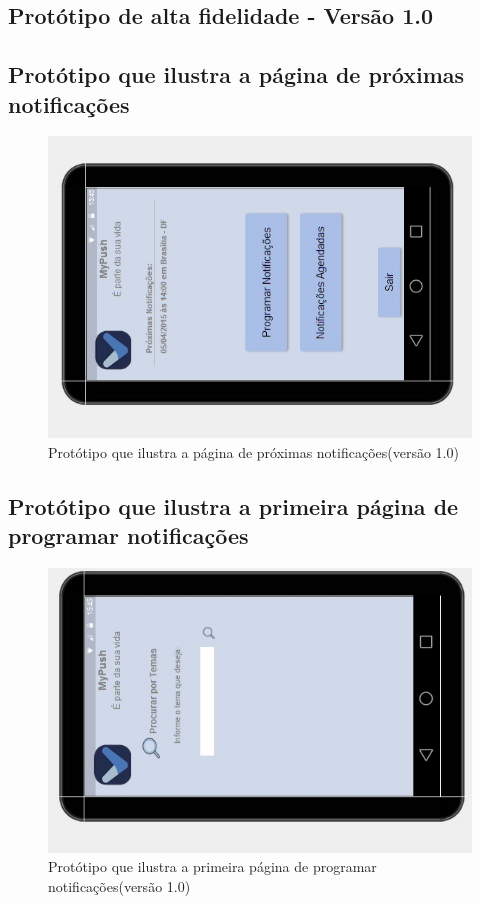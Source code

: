 \begin{apendicesenv}
\chapter{Protótipo de alta fidelidade - Versão 1.0}

  \section*{Protótipo que ilustra a página de próximas notificações}

    \begin{figure}[!htbp]
      \centering
      \includegraphics[scale=0.5, angle=-90]{editaveis/figuras/prototipo_alta_fidelidade_v1/1_1}
      \caption{Protótipo que ilustra a página de próximas notificações(versão 1.0)}
      \label{v1}
    \end{figure}
    
      \section*{Protótipo que ilustra a primeira página de programar notificações}

    \begin{figure}[!htbp]
      \centering
      \includegraphics[scale=0.5, angle=-90]{editaveis/figuras/prototipo_alta_fidelidade_v1/1_2}
      \caption{Protótipo que ilustra a primeira página de programar notificações(versão 1.0)}
      \label{v1}
    \end{figure}
    

\end{apendicesenv}
